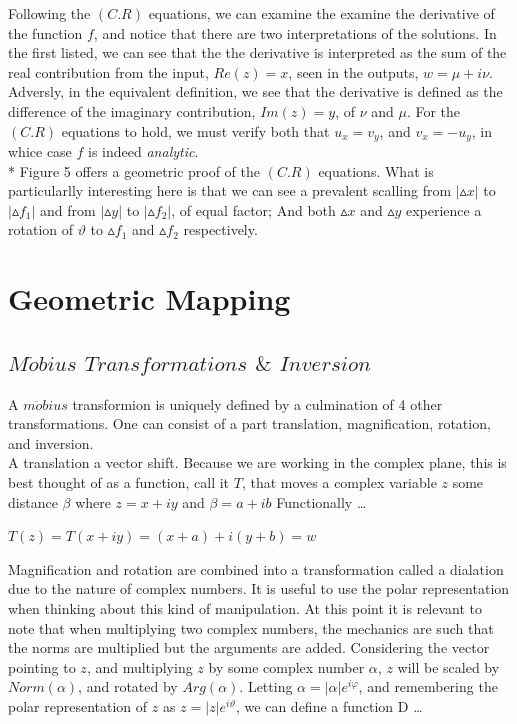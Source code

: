 \documentclass[a4paper,man,natbib]{apa6}
\begin{document}
Following the $ (C.R) $ equations, we can examine the examine the derivative of the function $ f $, and notice that there are two interpretations of the solutions.
In the first listed, we can see that the the derivative is interpreted as the sum of the real contribution from the input, $ Re(z) = x $, seen in the outputs, $ w = \mu + i\nu $.   
Adversly, in the equivalent definition, we see that the derivative is defined as the difference of the imaginary contribution, $ Im(z) = y $, of $ \nu $ and $ \mu $.
For the $ (C.R) $ equations to hold, we must verify both that $ u_{x} = v_{y} $, and $ v_{x} = -u_{y} $, in whice case $ f $ is indeed \textit{analytic}. \\
* Figure 5 offers a geometric proof of the $ (C.R) $ equations. 
What is particularlly interesting here is that we can see a prevalent scalling from $ |\vartriangle x| $ to $ |\vartriangle f_{1}| $ and from $ |\vartriangle y| $ to $ |\vartriangle f_{2}| $,
of equal factor; And both $ \vartriangle x $ and $ \vartriangle y $ experience a rotation of $ \vartheta $ to $ \vartriangle f_{1} $ and $ \vartriangle f_{2} $ respectively. 

\section{Geometric Mapping}
\label{sec: Mapping}

\subsection{$ M\ddot{o}bius $ $ Transformations $ $ \& $ $ Inversion $}

A $ m\ddot{o}bius $ transformion is uniquely defined by a culmination of 4 other transformations. One can consist of a part translation, magnification, rotation, and inversion.
\\
A translation a vector shift. Because we are working in the complex plane, this is best thought of as a function, call it $ T $, that 
moves a complex variable $ z $ some distance $ \beta $ where $ z = x + iy $ and $ \beta = a + ib $ Functionally \dots

\begin{center}

      $ T(z) = T(x + iy) = (x + a) + i(y +b) = w $ 

\end{center}

Magnification and rotation are combined into a transformation called a dialation due to the nature of complex numbers. 
It is useful to use the polar representation when thinking about this kind of manipulation. 
At this point it is relevant to note that when multiplying two complex numbers, the mechanics are such that the norms are multiplied but the arguments are added. 
Considering the vector pointing to $ z $, and multiplying $ z $ by some complex number $ \alpha $, $ z $ will be scaled by $ Norm(\alpha) $, and rotated by $ Arg(\alpha) $.
Letting $ \alpha = |\alpha |e^{i\varphi} $, and remembering the polar representation of $ z $ as $ z = |z|e^{i\vartheta} $, we can define a function D \dots
\end{document}
